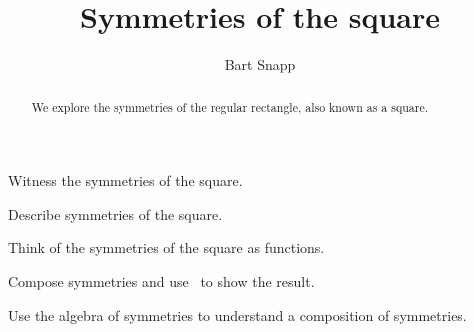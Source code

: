 \documentclass[noauthor,nooutcomes,12pt,hints,handout]{ximera}
\title{Symmetries of the square}
\author{Bart Snapp}
\begin{document}
\begin{abstract}
  We explore the symmetries of the regular rectangle, also known as a
  square.
\end{abstract}
\maketitle

\begin{listOutcomes}
\item Witness the symmetries of the square.
\item Describe symmetries of the square.
\item Think of the symmetries of the square as functions.
\item Compose symmetries and use \snap\ to show the result.
\item Use the algebra of symmetries to understand a composition of
  symmetries.
\end{listOutcomes}
\mynewpage
\end{document}
